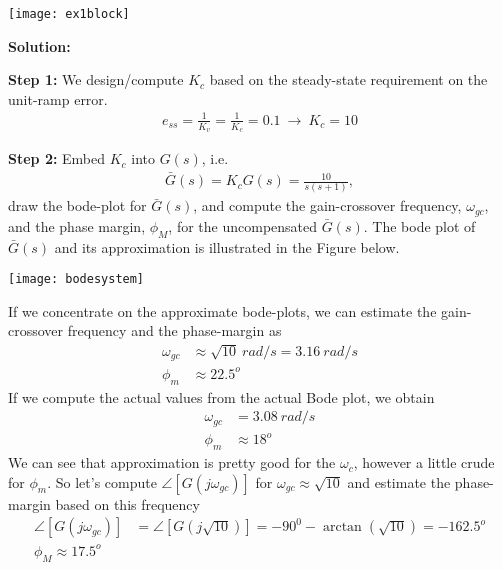 \documentclass[twoside]{article}
\begin{document}
\vspace{6pt}

     \begin{center}
 \begin{minipage}[h]{\linewidth}
     \begin{center}
       \texttt{[image: ex1block]}
     \end{center}
 \end{minipage}
     \end{center}

\vspace{6pt}

\textbf{Solution:}

\textbf{Step 1:} We design/compute $K_c$ based on the steady-state 
requirement on the unit-ramp error.  
%
\begin{align}
   e_{ss} = \frac{1}{K_v} = \frac{1}{K_c} = 0.1 \ \rightarrow \ K_c = 10
\end{align}

\textbf{Step 2:} Embed $K_c$ into $G(s)$, i.e. 
%
\begin{align*}
  \bar{G}(s) = K_c G(s) = \frac{10}{s (s+1)} ,
\end{align*} 
%
draw the bode-plot for $\bar{G}(s)$, and compute the gain-crossover
frequency, $\omega_{gc}$, and the phase margin, $\phi_M$, for the
uncompensated $\bar{G}(s)$. The bode plot of $\bar{G}(s)$ and its
approximation is illustrated in the Figure below. 

     \begin{center}
 \begin{minipage}[h]{\linewidth}
     \begin{center}
       \texttt{[image: bodesystem]}
     \end{center}
 \end{minipage}
     \end{center}

If we concentrate on the approximate bode-plots, we can estimate
the gain-crossover frequency and the phase-margin as
%
\begin{align*}
  \omega_{gc} &\approx \sqrt{10} \ rad/s = 3.16 \ rad/s
  \\
  \phi_m &\approx 22.5^o
\end{align*}
%
If we compute the actual values from the actual Bode plot, we obtain
%
\begin{align*}
  \omega_{gc} &= 3.08 \ rad/s
  \\
  \phi_m &\approx 18^o
\end{align*}
%
We can see that approximation is pretty good for the
$\omega_c$, however a little crude for $\phi_m$. 
So let's compute $\angle [ G(j \omega_{gc}) ] $ for 
$\omega_{gc} \approx \sqrt{10}$ and estimate the 
phase-margin based on this frequency
%
\begin{align*}
  \angle [ G(j \omega_{gc}) ] &= \angle [ G(j \sqrt{10}) ] =
 -90^0 - \arctan \left( \sqrt{10} \right) =  -162.5^o
  \\
 \phi_M \approx 17.5^o
\end{align*}
\end{document}
